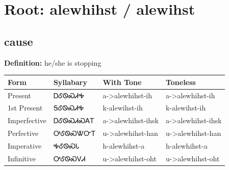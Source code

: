 \documentclass{article}%
\begin{document}
%
\normalsize%
\section*{Root: alewhihst / alewihst}%
\subsection*{cause}%
\textbf{Definition: }%
he/she is stopping%
\\[0.5em]%
\begin{tabular}{|l|l|l|l|}%
\hline%
\textbf{Form}&\textbf{Syllabary}&\textbf{With Tone}&\textbf{Toneless}\\%
\hline%
Present&ᎠᎴᏫᏍᏗᎭ&a{-}>alewhihst{-}ih&a{-}>alewhihst{-}ih\\%
1st Present&ᎦᎴᏫᏍᏗᎭ&k{-}alewihst{-}ih&k{-}alewihst{-}ih\\%
Imperfective&ᎠᎴᏫᏍᏗᏍᎪᎢ&a{-}>alewhihst{-}ihsk&a{-}>alewhihst{-}ihsk\\%
Perfective&ᎤᎴᏫᏍᏔᏅᎢ&u{-}>alewhihst{-}han&u{-}>alewhihst{-}han\\%
Imperative&ᎭᎴᏫᏍᏓ&h{-}alewhihst{-}a&h{-}alewhihst{-}a\\%
Infinitive&ᎤᎴᏫᏍᏙᏗ&u{-}>alewhihst{-}oht&u{-}>alewhihst{-}oht\\%
\hline%
\end{tabular}%
\\[1em]%
\end{document}
